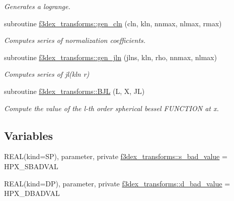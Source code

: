 \begin{DoxyCompactItemize}
\begin{DoxyCompactList}\small\item\em Generates a logrange. \end{DoxyCompactList}\item 
subroutine \hyperlink{namespacef3dex__transforms_aa6cd797c56b97503bf2d52131f6e5554}{f3dex\_\-transforms::gen\_\-cln} (cln, kln, nnmax, nlmax, rmax)
\begin{DoxyCompactList}\small\item\em Computes series of normalization coefficients. \end{DoxyCompactList}\item 
subroutine \hyperlink{namespacef3dex__transforms_ad1ab102a8307876c7af8bd6868ea7ef2}{f3dex\_\-transforms::gen\_\-jln} (jlns, kln, rho, nnmax, nlmax)
\begin{DoxyCompactList}\small\item\em Computes series of jl(kln r) \end{DoxyCompactList}\item 
subroutine \hyperlink{namespacef3dex__transforms_a9b68481c890d75c3e3f4cbd4a7109830}{f3dex\_\-transforms::BJL} (L, X, JL)
\begin{DoxyCompactList}\small\item\em Compute the value of the l-\/th order spherical bessel FUNCTION at x. \end{DoxyCompactList}\end{DoxyCompactItemize}
\subsection*{Variables}
\begin{DoxyCompactItemize}
\item 
REAL(kind=SP), parameter, private \hyperlink{namespacef3dex__transforms_a2fbf86c61b3f102ffaa43870e3523f02}{f3dex\_\-transforms::s\_\-bad\_\-value} = HPX\_\-SBADVAL
\item 
REAL(kind=DP), parameter, private \hyperlink{namespacef3dex__transforms_a179e0089cbbd29b50ea12d1a8298b99a}{f3dex\_\-transforms::d\_\-bad\_\-value} = HPX\_\-DBADVAL
\end{DoxyCompactItemize}
